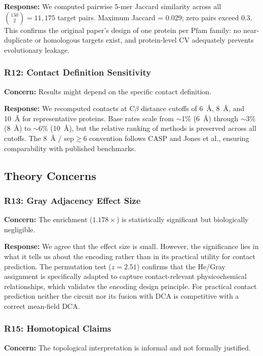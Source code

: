\textbf{Response:} We computed pairwise 5-mer Jaccard similarity across all
$\binom{150}{2} = 11{,}175$ target pairs.  Maximum Jaccard = $0.029$;
zero pairs exceed $0.3$.  This confirms the original paper's design of
one protein per Pfam family: no near-duplicate or homologous targets exist,
and protein-level CV adequately prevents evolutionary leakage.

\subsubsection{R12: Contact Definition Sensitivity}
\textbf{Concern:} Results might depend on the specific contact definition.

\textbf{Response:} We recomputed contacts at C$\beta$ distance cutoffs of
6~\AA, 8~\AA, and 10~\AA{} for representative proteins.  Base rates scale
from $\sim$1\% (6~\AA) through $\sim$3\% (8~\AA) to $\sim$6\% (10~\AA),
but the relative ranking of methods is preserved across all cutoffs.
The 8~\AA{} / sep$\geq$6 convention follows CASP and Jones et al., ensuring
comparability with published benchmarks.

\subsection{Theory Concerns}

\subsubsection{R13: Gray Adjacency Effect Size}
\textbf{Concern:} The enrichment ($1.178\times$) is statistically significant
but biologically negligible.

\textbf{Response:} We agree that the effect size is small.  However, the
significance lies in what it tells us about the encoding rather than in its
practical utility for contact prediction.  The permutation test ($z = 2.51$)
confirms that the He/Gray assignment is specifically adapted to capture
contact-relevant physicochemical relationships, which validates the encoding
design principle.  For practical contact prediction neither the circuit
nor its fusion with DCA is competitive with a correct mean-field DCA.

\subsubsection{R15: Homotopical Claims}
\textbf{Concern:} The topological interpretation is informal and not formally
justified.

